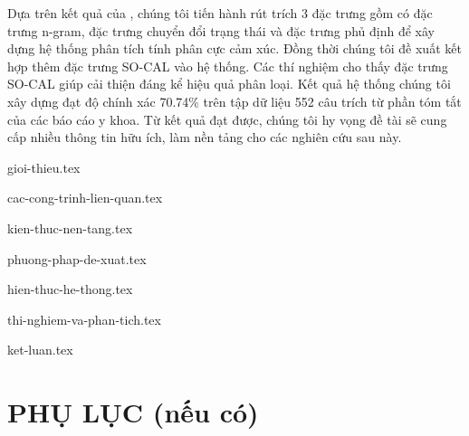 \documentclass[a4paper, 12pt]{article}
\theoremstyle{definition}
\begin{document}
Dựa trên kết quả của \cite{niu2005analysis}, chúng tôi tiến hành rút trích 3 đặc trưng gồm có đặc trưng n-gram, đặc trưng chuyển đổi trạng thái và đặc trưng phủ định để xây dựng hệ thống phân tích tính phân cực cảm xúc. Đồng thời chúng tôi đề xuất kết hợp thêm đặc trưng SO-CAL vào hệ thống. Các thí nghiệm cho thấy đặc trưng SO-CAL giúp cải thiện đáng kể hiệu quả phân loại. Kết quả hệ thống chúng tôi xây dựng đạt độ chính xác 70.74\% trên tập dữ liệu 552 câu trích từ phần tóm tắt của các báo cáo y khoa. Từ kết quả đạt được, chúng tôi hy vọng đề tài sẽ cung cấp nhiều thông tin hữu ích, làm nền tảng cho các nghiên cứu sau này.

\pagebreak
\tableofcontents

\thispagestyle{empty}
\pagebreak
\listoffigures
\pagebreak
\listoftables

\pagebreak
{gioi-thieu.tex}
\pagebreak

{cac-cong-trinh-lien-quan.tex}
\pagebreak

{kien-thuc-nen-tang.tex}
\pagebreak

{phuong-phap-de-xuat.tex}
\pagebreak

{hien-thuc-he-thong.tex}
\pagebreak

{thi-nghiem-va-phan-tich.tex}
\pagebreak

{ket-luan.tex}
\pagebreak

\printbibliography[title={Tài liệu tham khảo}]
\pagebreak

\section*{PHỤ LỤC (nếu có)}
\end{document}
